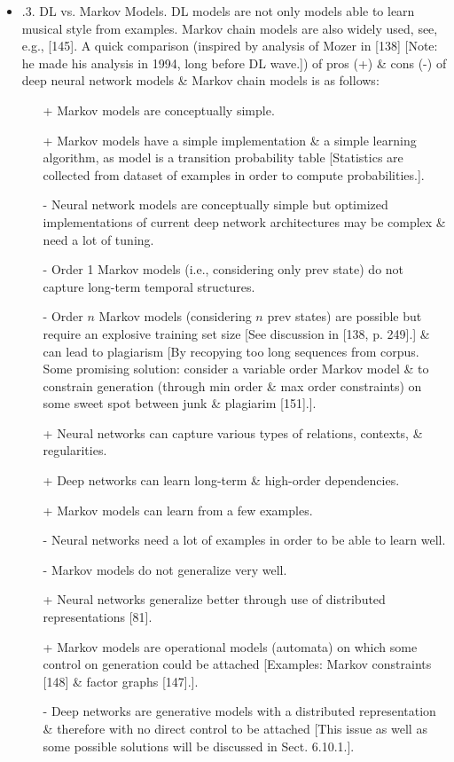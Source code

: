 \documentclass{article}
\begin{document}
\begin{itemize}
\begin{itemize}
\begin{itemize}
			\item {.3. DL vs. Markov Models.} DL models are not only models able to learn musical style from examples. Markov chain models are also widely used, see, e.g., [145]. A quick comparison (inspired by analysis of {\sc Mozer} in [138] [Note: he made his analysis in 1994, long before DL wave.]) of pros (+) \& cons (-) of deep neural network models \& Markov chain models is as follows:
			\begin{itemize}
				\item[+] Markov models are conceptually simple.
				\item[+] Markov models have a simple implementation \& a simple learning algorithm, as model is a transition probability table [Statistics are collected from dataset of examples in order to compute probabilities.].
				\item[-] Neural network models are conceptually simple but optimized implementations of current deep network architectures may be complex \& need a lot of tuning.
				\item[-] Order 1 Markov models (i.e., considering only prev state) do not capture long-term temporal structures.
				\item[-] Order $n$ Markov models (considering $n$ prev states) are possible but require an explosive training set size [See discussion in [138, p. 249].] \& can lead to plagiarism [By recopying too long sequences from corpus. Some promising solution: consider a variable order Markov model \& to constrain generation (through min order \& max order constraints) on some sweet spot between junk \& plagiarim [151].].
				\item[+] Neural networks can capture various types of relations, contexts, \& regularities.
				\item[+] Deep networks can learn long-term \& high-order dependencies.
				\item[+] Markov models can learn from a few examples.
				\item[-] Neural networks need a lot of examples in order to be able to learn well.
				\item[-] Markov models do not generalize very well.
				\item[+] Neural networks generalize better through use of distributed representations [81].
				\item[+] Markov models are operational models (automata) on which some control on generation could be attached [Examples: Markov constraints [148] \& factor graphs [147].].
				\item[-] Deep networks are generative models with a distributed representation \& therefore with no direct control to be attached [This issue as well as some possible solutions will be discussed in Sect. 6.10.1.].

\end{itemize}
\end{itemize}
\end{itemize}
\end{itemize}
\end{document}
